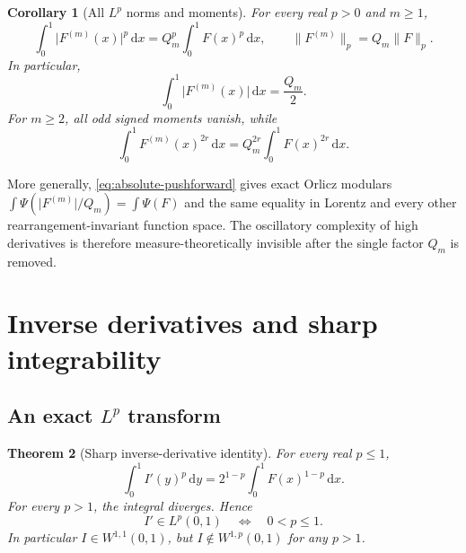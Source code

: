 \documentclass[11pt]{article}
\newtheorem{theorem}{Theorem}[section]
\newtheorem{corollary}[theorem]{Corollary}
\theoremstyle{definition}
\theoremstyle{remark}
\newcommand{\dd}{\,\mathrm d}
\newcommand{\abs}[1]{\lvert#1\rvert}
\newcommand{\norm}[1]{\lVert#1\rVert}
\begin{document}
\begin{corollary}[All \(L^p\) norms and moments]
\label{cor:Lp-derivatives}
For every real \(p>0\) and \(m\ge1\),
\begin{equation}
 \int_0^1\abs{F^{(m)}(x)}^p\dd x
 =Q_m^p\int_0^1F(x)^p\dd x,\qquad
 \norm{F^{(m)}}_p=Q_m\norm{F}_p.                           \label{eq:Lp-derivatives}
\end{equation}
In particular,
\begin{equation}
 \int_0^1\abs{F^{(m)}(x)}\dd x=\frac{Q_m}{2}.            \label{eq:total-variation-derivatives}
\end{equation}
For \(m\ge2\), all odd signed moments vanish, while
\begin{equation}
 \int_0^1F^{(m)}(x)^{2r}\dd x
 =Q_m^{2r}\int_0^1F(x)^{2r}\dd x.                        \label{eq:even-derivative-moments}
\end{equation}
\end{corollary}

More generally, \eqref{eq:absolute-pushforward} gives exact Orlicz modulars
\(
 \int\Psi(\abs{F^{(m)}}/Q_m)=\int\Psi(F)
\)
and the same equality in Lorentz and every other rearrangement-invariant function space.
The oscillatory complexity of high derivatives is therefore measure-theoretically
invisible after the single factor \(Q_m\) is removed.

\section{Inverse derivatives and sharp integrability}

\subsection{An exact \(L^p\) transform}

\begin{theorem}[Sharp inverse-derivative identity]
\label{thm:inverse-derivative-Lp}
For every real \(p\le1\),
\begin{equation}
 \boxed{
 \int_0^1I'(y)^p\dd y
 =2^{1-p}\int_0^1F(x)^{1-p}\dd x.
 }                                                        \label{eq:inverse-derivative-Lp}
\end{equation}
For every \(p>1\), the integral diverges.  Hence
\begin{equation}
 I'\in L^p(0,1)\quad\Longleftrightarrow\quad0<p\le1.     \label{eq:Iprime-threshold}
\end{equation}
In particular \(I\in W^{1,1}(0,1)\), but \(I\notin W^{1,p}(0,1)\) for any
\(p>1\).
\end{theorem}
\end{document}
